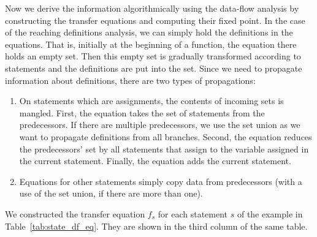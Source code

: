 Now we derive the information algorithmically using the data-flow analysis by
constructing the transfer equations and computing their fixed point. In the
case of the reaching definitions analysis, we can simply hold the definitions
in the equations.  That is, initially at the beginning of a function, the
equation there holds an empty set. Then this empty set is gradually
transformed according to statements and the definitions are put into the set.
Since we need to propagate information about definitions, there are two
types of propagations:
\begin{enumerate}
\item On statements which are assignments, the contents of incoming sets is
mangled. First, the equation takes the set of statements from the
predecessors. If there are multiple predecessors, we use the set union as we
want to propagate definitions from all branches. Second, the equation reduces
the predecessors' set by all statements that assign to the variable assigned
in the current statement. Finally, the equation adds the current statement.

\item Equations for other statements simply copy data from predecessors (with
a use of the set union, if there are more than one).

\end{enumerate}
We constructed the transfer equation $f_s$ for each statement $s$ of the
example in Table~\ref{tab:state_df_eq}. They are shown in the third column of
the same table.
